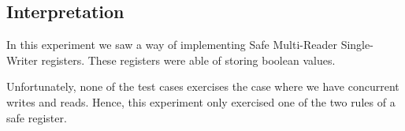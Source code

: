 \subsection{Interpretation}
\par
In this experiment we saw a way of implementing Safe Multi-Reader Single-Writer
registers. These registers were able of storing boolean values.
\par
Unfortunately, none of the test cases exercises the case where we have
concurrent writes and reads. Hence, this experiment only exercised one of the
two rules of a safe register.
